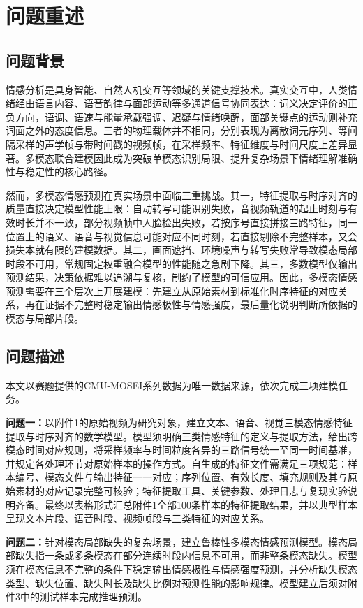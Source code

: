 \section{问题重述}
\subsection{问题背景}
情感分析是具身智能、自然人机交互等领域的关键支撑技术。真实交互中，人类情绪经由语言内容、语音韵律与面部运动等多通道信号协同表达：词义决定评价的正负方向，语调、语速与能量承载强调、迟疑与情绪唤醒，面部关键点的运动则补充词面之外的态度信息。三者的物理载体并不相同，分别表现为离散词元序列、等间隔采样的声学帧与带时间戳的视频帧，在采样频率、特征维度与时间尺度上差异显著。多模态联合建模因此成为突破单模态识别局限、提升复杂场景下情绪理解准确性与稳定性的核心路径\cite{ref:mm}。

然而，多模态情感预测在真实场景中面临三重挑战。其一，特征提取与时序对齐的质量直接决定模型性能上限：自动转写可能识别失败，音视频轨道的起止时刻与有效时长并不一致，部分视频帧中人脸检出失败，若按序号直接拼接三路特征，同一位置上的语义、语音与视觉信息可能对应不同时刻，若直接剔除不完整样本，又会损失本就有限的建模数据。其二，画面遮挡、环境噪声与转写失败常导致模态局部时段不可用，常规固定权重融合模型的性能随之急剧下降。其三，多数模型仅输出预测结果，决策依据难以追溯与复核，制约了模型的可信应用。因此，多模态情感预测需要在三个层次上开展建模：先建立从原始素材到标准化时序特征的对应关系，再在证据不完整时稳定输出情感极性与情感强度，最后量化说明判断所依据的模态与局部片段。

\subsection{问题描述}
本文以赛题提供的CMU-MOSEI系列数据\cite{ref:mosei}为唯一数据来源，依次完成三项建模任务。

\textbf{问题一：}以附件1的原始视频为研究对象，建立文本、语音、视觉三模态情感特征提取与时序对齐的数学模型。模型须明确三类情感特征的定义与提取方法，给出跨模态时间对应规则，将采样频率与时间粒度各异的三路信号统一至同一时间基准，并规定各处理环节对原始样本的操作方式。自生成的特征文件需满足三项规范：样本编号、模态文件与输出特征一一对应；序列位置、有效长度、填充规则及其与原始素材的对应记录完整可核验；特征提取工具、关键参数、处理日志与复现实验说明齐备。最终以表格形式汇总附件1全部100条样本的特征提取结果，并以典型样本呈现文本片段、语音时段、视频帧段与三类特征的对应关系。

\textbf{问题二：}针对模态局部缺失的复杂场景，建立鲁棒性多模态情感预测模型。模态局部缺失指一条或多条模态在部分连续时段内信息不可用，而非整条模态缺失。模型须在模态信息不完整的条件下稳定输出情感极性与情感强度预测，并分析缺失模态类型、缺失位置、缺失时长及缺失比例对预测性能的影响规律。模型建立后须对附件3中的测试样本完成推理预测。

